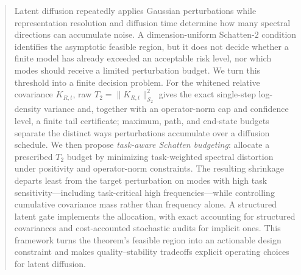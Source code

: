 



\maketitle

\begin{abstract}
Latent diffusion repeatedly applies Gaussian perturbations while representation
resolution and diffusion time determine how many spectral directions can
accumulate noise. A dimension-uniform Schatten-$2$ condition identifies the
asymptotic feasible region, but it does not decide whether a finite model has
already exceeded an acceptable risk level, nor which modes should receive a
limited perturbation budget. We turn this threshold into a finite decision
problem. For the whitened relative covariance $K_{R,t}$, raw
$T_2=\lVert K_{R,t}\rVert_{\mathcal S_2}^2$ gives the exact single-step
log-density variance and, together with an operator-norm cap and confidence
level, a finite tail certificate; maximum, path, and end-state budgets
separate the distinct ways perturbations accumulate over a diffusion schedule.
We then propose \emph{task-aware Schatten budgeting}: allocate a prescribed
$T_2$ budget by minimizing task-weighted spectral distortion under positivity
and operator-norm constraints. The resulting shrinkage departs least from the
target perturbation on modes with high task sensitivity---including
task-critical high frequencies---while
controlling cumulative covariance mass rather than frequency alone. A structured
latent gate implements the allocation, with exact accounting for structured
covariances and cost-accounted stochastic audits for implicit ones.
This framework turns the theorem's feasible region into an actionable design
constraint and makes quality--stability tradeoffs explicit operating choices
for latent diffusion.
\end{abstract}












\appendix



